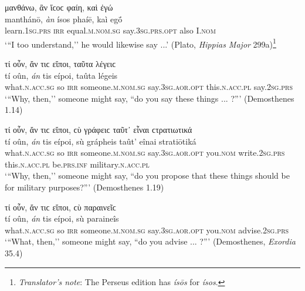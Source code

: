 \begin{exe}
\ex μανθάνω, ἂν ἴϲοϲ φαίη, καὶ ἐγώ\\
\gll manthánō, \emph{àn} ísos phaíē, kaì egṓ\\
learn.\textsc{1sg.prs} \textsc{irr} equal.\textsc{m.nom.sg} say.\textsc{3sg.prs.opt} also I.\textsc{nom}\\
\trans `{``}I too understand,'' he would likewise say ...' (Plato, \textit{Hippias Major} 299a)\footnote{\emph{Translator's note}: The Perseus edition has \textit{ísōs} for \textit{ísos}.}
\label{anraise3}
\end{exe}

\begin{exe}
\ex τί οὖν, ἄν τιϲ εἴποι, ταῦτα λέγειϲ\\
\gll tí oûn, \emph{án} tis eípoi, taûta légeis\\
what.\textsc{n.acc.sg} so \textsc{irr} someone.\textsc{m.nom.sg} say.\textsc{3sg.aor.opt} this.\textsc{n.acc.pl} say.\textsc{2sg.prs}\\
\trans `{``}Why, then,'' someone might say, ``do you say these things ... ?''' (Demosthenes 1.14)
\label{anraise4}
\end{exe}

\begin{exe}
\ex τί οὖν, ἄν τιϲ εἴποι, ϲὺ γράφειϲ ταῦτ᾽ εἶναι ϲτρατιωτικά\\
\gll tí oûn, \emph{án} tis eípoi, sù grápheis taût' eînai stratiōtiká\\
what.\textsc{n.acc.sg} so \textsc{irr} someone.\textsc{m.nom.sg} say.\textsc{3sg.aor.opt} you.\textsc{nom} write.\textsc{2sg.prs} this.\textsc{n.acc.pl} be.\textsc{prs.inf} military.\textsc{n.acc.pl}\\
\trans `{``}Why, then,'' someone might say, ``do you propose that these things should be for military purposes?''' (Demosthenes 1.19)
\label{anraise5}
\end{exe}

\begin{exe}
\ex τί οὖν, ἄν τιϲ εἴποι, ϲὺ παραινεῖϲ\\
\gll tí oûn, \emph{án} tis eípoi, sù paraineîs\\
what.\textsc{n.acc.sg} so \textsc{irr} someone.\textsc{m.nom.sg} say.\textsc{3sg.aor.opt} you.\textsc{nom} advise.\textsc{2sg.prs}\\
\trans `{``}What, then,'' someone might say, ``do you advise ... ?''' (Demosthenes, \textit{Exordia} 35.4)
\label{anraise6}
\end{exe}

